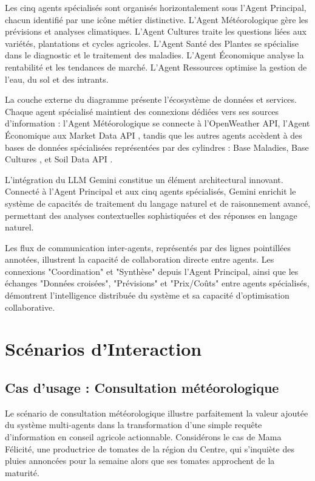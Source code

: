 Les cinq agents spécialisés sont organisés horizontalement sous l'Agent Principal, chacun identifié par une icône métier distinctive. L'Agent Météorologique gère les prévisions et analyses climatiques. L'Agent Cultures traite les questions liées aux variétés, plantations et cycles agricoles. L'Agent Santé des Plantes se spécialise dans le diagnostic et le traitement des maladies. L'Agent Économique  analyse la rentabilité et les tendances de marché. L'Agent Ressources optimise la gestion de l'eau, du sol et des intrants.

La couche externe du diagramme présente l'écosystème de données et services. Chaque agent spécialisé maintient des connexions dédiées vers ses sources d'information : l'Agent Météorologique se connecte à l'OpenWeather API, l'Agent Économique aux Market Data API , tandis que les autres agents accèdent à des bases de données spécialisées représentées par des cylindres : Base Maladies, Base Cultures , et Soil Data API .

L'intégration du LLM Gemini constitue un élément architectural innovant. Connecté à l'Agent Principal et aux cinq agents spécialisés, Gemini enrichit le système de capacités de traitement du langage naturel et de raisonnement avancé, permettant des analyses contextuelles sophistiquées et des réponses en langage naturel.

Les flux de communication inter-agents, représentés par des lignes pointillées annotées, illustrent la capacité de collaboration directe entre agents. Les connexions "Coordination" et "Synthèse" depuis l'Agent Principal, ainsi que les échanges "Données croisées", "Prévisions" et "Prix/Coûts" entre agents spécialisés, démontrent l'intelligence distribuée du système et sa capacité d'optimisation collaborative.


\section{Scénarios d'Interaction}

\subsection{Cas d'usage : Consultation météorologique}

Le scénario de consultation météorologique illustre parfaitement la valeur ajoutée du système multi-agents dans la transformation d'une simple requête d'information en conseil agricole actionnable. Considérons le cas de Mama Félicité, une productrice de tomates de la région du Centre, qui s'inquiète des pluies annoncées pour la semaine alors que ses tomates approchent de la maturité.

